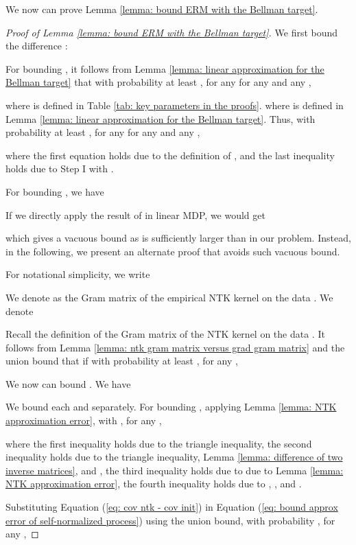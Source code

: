 \documentclass{article} \usepackage{iclr2023/iclr2023_conference,times}
\begin{document}
We now can prove Lemma \ref{lemma: bound ERM with the Bellman target}. 
\begin{proof}[Proof of Lemma \ref{lemma: bound ERM with the Bellman target}]

We first bound the difference :


For bounding , it follows from Lemma \ref{lemma: linear approximation for the Bellman target} that with probability at least , for any for any  and any , 

where  is defined in Table \ref{tab: key parameters in the proofs}.
where  is defined in Lemma \ref{lemma: linear approximation for the Bellman target}. 
Thus, with probability at least , for any for any  and any , 

where the first equation holds due to the definition of , and the last inequality holds due to Step I with . 

For bounding , we have



If we directly apply the result of \cite{jin2021pessimism} in linear MDP, we would get

which gives a vacuous bound as  is sufficiently larger than  in our problem. Instead, in the following, we present an alternate proof that avoids such vacuous bound. 

For notational simplicity, we write 

We denote  as the Gram matrix of the empirical NTK kernel on the data . We denote 

Recall the definition of the Gram matrix  of the NTK kernel on the data . It follows from Lemma \ref{lemma: ntk gram matrix versus grad gram matrix} and the union bound that if  with probability at least , for any ,




We now can bound . We have 



We bound each  and  separately. For bounding , applying Lemma \ref{lemma: NTK approximation error}, with , for any , 

where the first inequality holds due to the triangle inequality, the second inequality holds due to the triangle inequality, Lemma \ref{lemma: difference of two inverse matrices}, and , the third inequality holds due to  due to Lemma \ref{lemma: NTK approximation error}, the fourth inequality holds due to , , and . 

Substituting Equation (\ref{eq: cov ntk - cov init}) in Equation (\ref{eq: bound approx error of self-normalized process}) using the union bound, with probability , for any , 


\end{proof}
\end{document}
